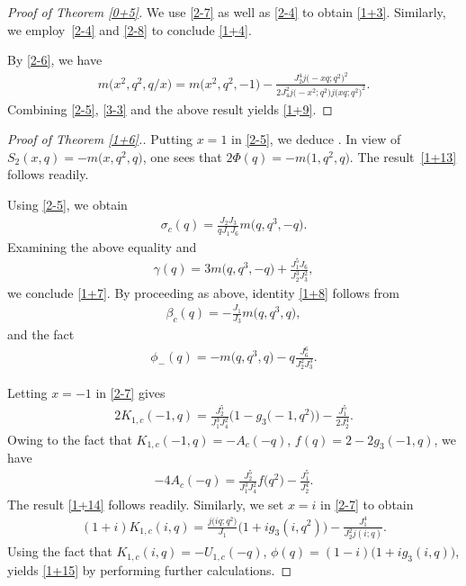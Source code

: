 \documentclass[10pt,a4paper]{amsart}
\numberwithin{equation}{section}
\begin{document}
\begin{proof}[Proof of Theorem \ref{0+5}]

We use \eqref{2-7} as well as \eqref{2-4} to obtain \eqref{1+3}. Similarly, we employ~\eqref{2-4} and \eqref{2-8} to conclude \eqref{1+4}.

By \eqref{2-6}, we have
\begin{align*}
m\bigl(x^2,q^2,q/x\bigr)=m\bigl(x^2,q^2,-1\bigr)
-\frac{J_2^4j\bigl(-xq;q^2\bigr)^2}{2J_4^2j\bigl(-x^2;q^2\bigr)j\bigl(xq;q^2\bigr)^2}.
\end{align*}
Combining \eqref{2-5}, \eqref{3-3} and the above result yields \eqref{1+9}.
\end{proof}

\begin{proof}[Proof of Theorem \ref{1+6}.] Putting $x=1$ in \eqref{2-5}, we deduce
.
In view of \cite[equation~(2.12)]{Mo1}
$
S_2(x,q)=-m\bigl(x,q^2,q\bigr)$,
one sees that
$
2\varPhi(q)=-m\bigl(1,q^2,q\bigr)$.
The result~\eqref{1+13} follows readily.

Using \eqref{2-5}, we obtain
\begin{align}\label{4-1}
\sigma_c(q)=\frac{J_2J_3}{qJ_1J_6}m\bigl(q,q^3,-q\bigr).
\end{align}
Examining the above equality and \cite[equation~(5.29)]{HM}
\begin{align*}
\gamma(q)=3m\bigl(q,q^3,-q\bigr)+\frac{J_1^5J_6}{J_2^3J_3^2},
\end{align*}
we conclude \eqref{1+7}. By proceeding as above, identity \eqref{1+8} follows from
\begin{align}\label{4-2}
\beta_c(q)=-\frac{J_1}{J_3}m\bigl(q,q^3,q\bigr),
\end{align}
and the fact \cite[equation~(5.30)]{HM}
\begin{align*}
\phi_-(q)=-m\bigl(q,q^3,q\bigr)-q\frac{J_6^6}{J_2^2J_3^3}.
\end{align*}

Letting $x=-1$ in \eqref{2-7} gives
\begin{align*}
2K_{1,c}(-1,q)=\frac{J_2^5}{J_1^3J_4^2}\bigl(1-g_3\bigl(-1,q^2\bigr)\bigr)-\frac{J_1^5}{2J_2^4}.
\end{align*}
Owing to the fact that
$
 K_{1,c}(-1,q)=-A_c(-q)$,
$f(q)= 2-2g_3(-1,q)$,
we have
\begin{align*}
-4A_c(-q)=\frac{J_2^5}{J_1^3J_4^2}f\bigl(q^2\bigr)-\frac{J_1^5}{J_2^4}.
\end{align*}
The result \eqref{1+14} follows readily. Similarly, we set $x=i$ in \eqref{2-7} to obtain
\begin{align*}
(1+i)K_{1,c}(i,q)=\frac{j\bigl(iq;q^2\bigr)}{J_1}\bigl(1+ig_3(i,q^2)\bigr)
-\frac{J_1^4}{J_2^2j(i;q)}.
\end{align*}
Using the fact that
$K_{1,c}(i,q)=-U_{1,c}(-q)$,
$\phi(q)= (1-i)\bigl(1+ig_3(i,q)\bigr)$,
yields \eqref{1+15} by performing further calculations.


\end{proof}
\end{document}
